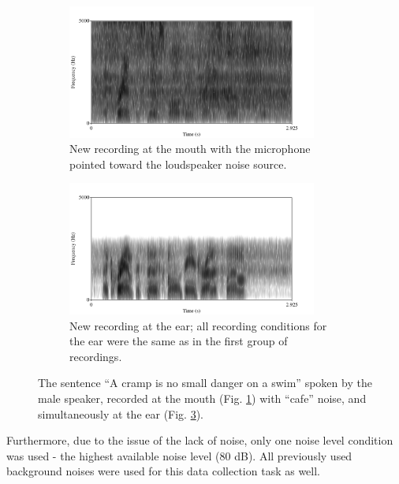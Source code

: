 \documentclass[dissertation,copyright]{uathesis}
\begin{document}
\begin{figure}
\begin{subfigure}{0.5\textwidth}
  \centering
  \includegraphics[width=0.9\textwidth]{figure/spectNewMouthNoise.png}
  \caption{New recording at the mouth with the microphone pointed toward the loudspeaker noise source.}
  \label{fig:spectNewMouthNoise}
\end{subfigure}
%
\begin{subfigure}{0.5\textwidth}
  \centering
  \includegraphics[width=0.9\textwidth]{figure/spectNewEarNoise.png}
  \caption{New recording at the ear; all recording conditions for the ear were the same as in the first group of recordings.}
  \label{fig:spectNewEarNoise}
\end{subfigure}
\caption{The sentence ``A cramp is no small danger on a swim'' spoken by the male speaker, recorded at the mouth (Fig. \ref{fig:spectNewMouthNoise}) with ``cafe'' noise, and simultaneously at the ear (Fig. \ref{fig:spectNewEarNoise}).}
\end{figure}


Furthermore, due to the issue of the lack of noise, only one noise level condition was used - the highest available noise level (80 dB).  All previously used background noises were used for this data collection task as well.
\end{document}
